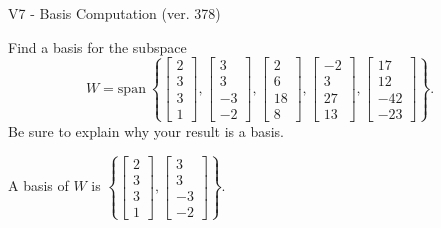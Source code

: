 \begin{exercise}
  \begin{exerciseTitle}V7 - Basis Computation (ver. 378)\end{exerciseTitle}
  \begin{exerciseStatement}
    Find a basis for the subspace 
\[W=\mathrm{span}\ \left\{\left[\begin{array}{r}
2 \\
3 \\
3 \\
1
\end{array}\right] , \left[\begin{array}{r}
3 \\
3 \\
-3 \\
-2
\end{array}\right] , \left[\begin{array}{r}
2 \\
6 \\
18 \\
8
\end{array}\right] , \left[\begin{array}{r}
-2 \\
3 \\
27 \\
13
\end{array}\right] , \left[\begin{array}{r}
17 \\
12 \\
-42 \\
-23
\end{array}\right]\right\}.\]
 Be sure to explain why your result is a basis.


  \end{exerciseStatement}
  \begin{exerciseAnswer}
   A basis of \(W\) is  \(\left\{\left[\begin{array}{r}
2 \\
3 \\
3 \\
1
\end{array}\right] , \left[\begin{array}{r}
3 \\
3 \\
-3 \\
-2
\end{array}\right]\right\}\).
  


  \end{exerciseAnswer}
\end{exercise}